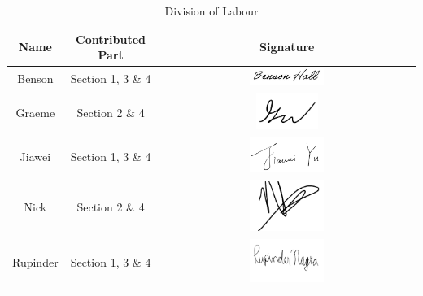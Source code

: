 \documentclass[]{article}
\begin{document}
\begin{table}[h]
    \centering
    \begin{tabular}{|c|c|c|}
    \hline
        \textbf{Name} & \textbf{Contributed Part} & \textbf{Signature} \\
        \hline
        Benson & 
        Section 1, 3 \& 4 & \includegraphics[width=0.3\textwidth]{signatures/bensonsignature.JPG}\\
        \hline
        Graeme & 
        Section 2 \& 4 & \includegraphics[width=0.25\textwidth]{signatures/graeme_signature.png} \\
        \hline
        Jiawei & 
        Section 1, 3 \& 4 & \includegraphics[width=0.3\textwidth]{signatures/Signature_Jiawei.PNG}\\
        \hline
        Nick & 
        Section 2 \& 4 & \includegraphics[width=0.3\textwidth]{signatures/nick signature.PNG} \\
        \hline
        Rupinder & 
        Section 1, 3 \& 4 & \includegraphics[width=0.3\textwidth]{signatures/Rupinder Signature.png}\\
        \hline
    \end{tabular}
    \caption{Division of Labour}
    \label{tab:my_label}
\end{table}


\newpage
\end{document}
